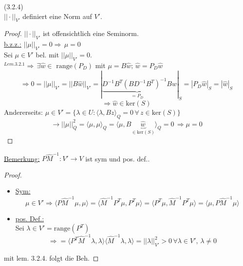\begin{lemma}(3.2.4)\\
$|| \cdot ||_{V'}$ definiert eine Norm auf $V'$.
\end{lemma}
\begin{proof}
$||\cdot ||_{V'}$ ist offensichtlich eine Seminorm.\\
\underline{b.z.z.:} $||\mu||_{V'} =0 \Rightarrow \, \mu=0$ \\
Sei $\mu \in V'$ bel. mit $||\mu||_{V'} =0$.\\
$^{Lem. 3.2.1}\Rightarrow \, \exists \hat w\in\text{ range}(P_D)$ mit $\mu =B\hat w;\, \hat w =P_D \hat w $\\
\[ \Rightarrow 0=||\mu||_{V'} =|| B\hat w||_{V'} =| \underbrace{D^{-1}B^T(BD^{-1}B^T)^{-1}B}_{=P_D}\hat w|_S =|P_D \hat w|_S =|\hat w|_S \]
\[\Rightarrow \hat w \in \text{ker}(S) \]
Andererseits: $\mu \in V' = \{ \lambda \in U : \langle \lambda,Bz\rangle_Q=0 \, \forall \, z \in \text{ker}(S) \}$\\
\[ \rightarrow ||\mu||_Q^2 =\langle \mu,\mu \rangle_Q = \langle \mu, B\underbrace{\hat w}_{\in \text{ker}(S)} \rangle_Q =0 \, \Rightarrow \mu=0 \]
\end{proof}

\underline{Bemerkung:} $P{\hat M}^{-1} : V' \to V$ ist sym und pos. def.. \\

\begin{proof}
\begin{itemize}
\item \underline{Sym:}
\[ \mu \in V' \Rightarrow \langle P{\hat M}^{-1}\mu,\mu\rangle = \langle {\hat M}^{-1}P^T\mu,P^T\mu\rangle = \langle P^T\mu,{\hat M}^{-1}P^T\mu\rangle = \langle \mu, P {\hat M}^{-1} \mu \rangle \]
\item
\underline{pos. Def.:}\\
Sei $\lambda \in V'=\text{range}(P^T)$\\
\[\Rightarrow  = \langle P^T {\hat M}^{-1}\lambda,\lambda \rangle\langle {\hat M}^{-1}\lambda,\lambda \rangle = || \lambda ||^2_{V'} > 0 \, \forall \lambda \in V',\, \lambda \neq 0 \]
\end{itemize}
mit lem. 3.2.4. folgt die Beh.
\end{proof}
